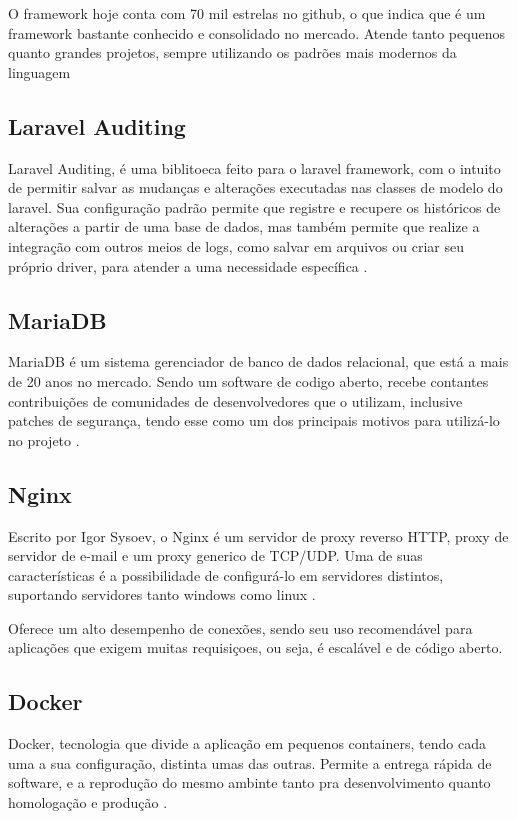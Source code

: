         O framework hoje conta com 70 mil estrelas no github, o que indica que é um framework bastante conhecido e consolidado no mercado. Atende tanto pequenos quanto grandes projetos, sempre utilizando os padrões mais modernos da linguagem \citep{lararepo}
        
\subsection{Laravel Auditing}
    Laravel Auditing, é uma biblitoeca feito para o laravel framework, com o intuito de permitir salvar as mudanças e alterações executadas nas classes de modelo do laravel. Sua configuração padrão permite que registre e recupere os históricos de alterações a partir de uma base de dados, mas também permite que realize a integração com outros meios de logs, como salvar em arquivos ou criar seu próprio driver, para atender a uma necessidade específica \citep{auditdocs}.
    

\subsection{MariaDB}
    MariaDB é um sistema gerenciador de banco de dados relacional, que está a mais de 20 anos no mercado.  Sendo um software de codigo aberto, recebe contantes contribuições de comunidades de desenvolvedores que o utilizam, inclusive patches de segurança, tendo esse como um dos principais motivos para utilizá-lo no projeto \citep{mariadbdocs}.
    
\subsection{Nginx}
    Escrito por Igor Sysoev, o Nginx é um servidor de proxy reverso HTTP, proxy de servidor de e-mail e um proxy generico de TCP/UDP. Uma de suas características é a possibilidade de configurá-lo em servidores distintos, suportando servidores tanto windows como linux \citep{nginxdocs}.

    Oferece um alto desempenho de conexões, sendo seu uso recomendável para aplicações que exigem muitas requisiçoes, ou seja, é escalável e de código aberto.
    
\subsection{Docker}

    Docker, tecnologia que divide a aplicação em pequenos containers, tendo cada uma a sua configuração, distinta umas das outras. Permite a entrega rápida de software, e a reprodução do mesmo ambinte tanto pra desenvolvimento quanto homologação e produção \citep{dockerdocs}. 